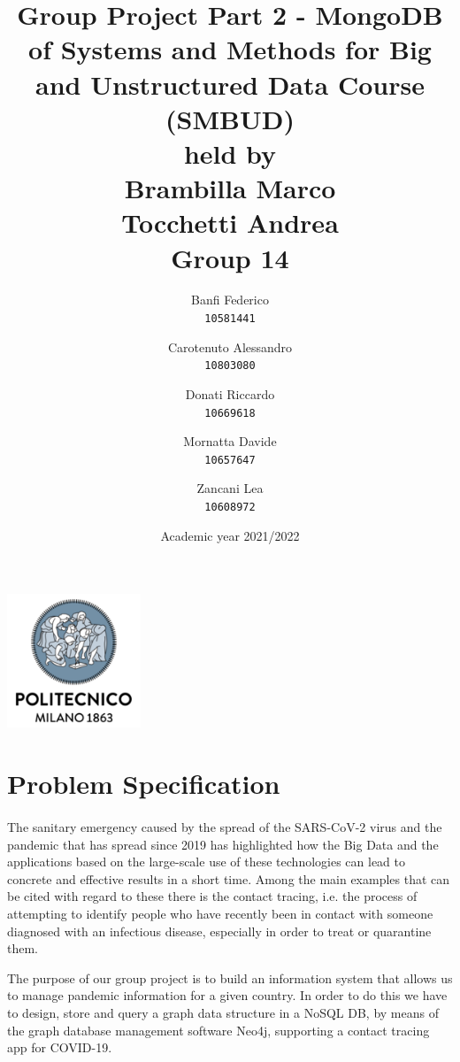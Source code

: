 \documentclass[a4paper,12pt]{article}
\begin{document}
\title{%
  Group Project Part 2 - MongoDB \\
  \large of Systems and Methods for Big
    and Unstructured Data Course \\(SMBUD)\\
    held by\\ Brambilla Marco\\ Tocchetti Andrea \\
  \vspace{5mm}
  \Large \textbf{Group 14}}
\author{Banfi Federico\\
  \texttt{10581441}
  \and
  Carotenuto Alessandro\\
  \texttt{10803080}
  \and
  Donati Riccardo\\
  \texttt{10669618}
  \and
  Mornatta Davide\\
  \texttt{10657647}
  \and
  Zancani Lea\\
  \texttt{10608972}}
\date{Academic year 2021/2022}
\maketitle
\begin{center}
  \includegraphics[width=4cm]{polilogo.png}\\
\end{center}
\newpage
\tableofcontents
\newpage
\section{Problem Specification}
\paragraph{}The sanitary emergency caused by the spread of the SARS-CoV-2 virus and the pandemic that has spread since 2019 has highlighted how the Big Data and the applications based on the large-scale use of these technologies can lead to concrete and effective results in a short time. Among the main examples that can be cited with regard to these there is the contact tracing, i.e. the process of attempting to identify people who have recently been in contact with someone diagnosed with an infectious disease, especially in order to treat or quarantine them. \par
The purpose of our group project is to build an information system that allows us to manage pandemic information for a given country. In order to do this we have to design, store and query a graph data structure in a NoSQL DB, by means of the graph database management software Neo4j, supporting a contact tracing app for COVID-19.
\end{document}
